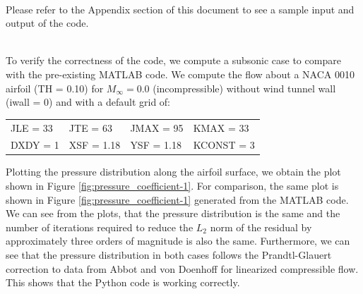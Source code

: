 \documentclass[12pt]{article}
\theoremstyle{definition}
\begin{document}
\vspace{1cm}


\\
Please refer to the Appendix section of this document to see a sample input and output of the code.\\

\vspace{1cm}

\\

To verify the correctness of the code, we compute a subsonic case to compare with the pre-existing MATLAB code. We compute the flow about a NACA 0010 airfoil (TH = 0.10) for $M_\infty = 0.0$ (incompressible) without wind tunnel wall (iwall = 0) and with a default grid of:

\begin{center}
\begin{tabular}{@{} l l l l @{}}
    JLE = 33  & JTE = 63  & JMAX = 95  & KMAX = 33 \\
    DXDY = 1  & XSF = 1.18  & YSF = 1.18  & KCONST = 3
\end{tabular}    
\end{center}

Plotting the pressure distribution along the airfoil surface, we obtain the plot shown in Figure \ref{fig:pressure_coefficient-1}. For comparison, the same plot is shown in Figure \ref{fig:pressure_coefficient-1} generated from the MATLAB code.  We can see from the plots, that the pressure distribution is the same and the number of iterations required to reduce the $L_2$ norm of the residual by approximately three orders of magnitude is also the same. Furthermore, we can see that the pressure distribution in both cases follows the Prandtl-Glauert correction to data from Abbot and von Doenhoff for linearized compressible flow. This shows that the Python code is working correctly.

\end{document}
